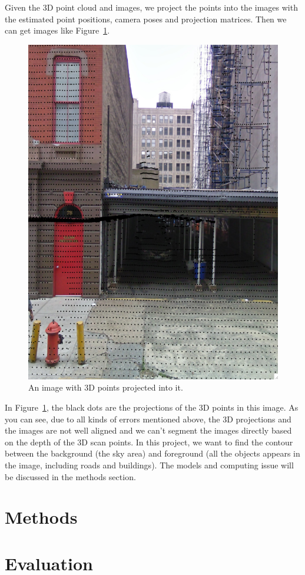 \documentclass{article} %
\begin{document}
Given the 3D point cloud and images, we project the points into the
images with the estimated point positions, camera poses and projection
matrices. Then we can get images like Figure~\ref{fig-data_image}.

\begin{figure}[h]
\begin{center}
\includegraphics[height=0.5\linewidth]{./fig/image_sample.png}
\end{center}
\caption{An image with 3D points projected into it.}
\label{fig-data_image}
\end{figure}

In Figure~\ref{fig-data_image}, the black dots are the projections of
the 3D points in this image. As you can see, due to all kinds of
errors mentioned above, the 3D projections and the images are not well
aligned and we can't segment the images directly based on the depth of
the 3D scan points. In this project, we want to find the contour
between the background (the sky area) and foreground (all the objects
appears in the image, including roads and buildings). The models and
computing issue will be discussed in the methods section.

\section{Methods}

\section{Evaluation}




\end{document}
